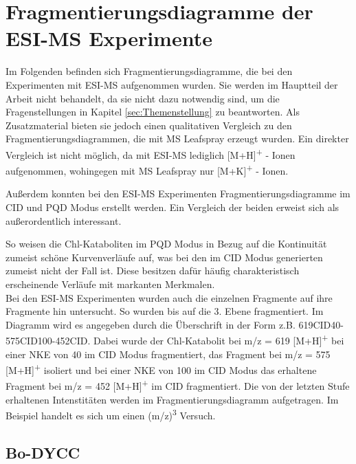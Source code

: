 \chapter{Fragmentierungsdiagramme der ESI-MS Experimente}

Im Folgenden befinden sich Fragmentierungsdiagramme, die bei den Experimenten mit ESI-MS aufgenommen wurden. Sie werden im Hauptteil der Arbeit nicht behandelt, da sie nicht dazu notwendig sind, um die Fragenstellungen in Kapitel \ref{sec:Themenstellung} zu beantworten. Als Zusatzmaterial bieten sie jedoch einen qualitativen Vergleich zu den Fragmentierungsdiagrammen, die mit MS Leafspray erzeugt wurden. Ein direkter Vergleich ist nicht möglich, da mit ESI-MS lediglich [M+H]\textsuperscript{+} - Ionen aufgenommen, wohingegen mit MS Leafspray nur [M+K]\textsuperscript{+} - Ionen.

Außerdem konnten bei den ESI-MS Experimenten Fragmentierungsdiagramme im CID und PQD Modus erstellt werden. Ein Vergleich der beiden erweist sich als außerordentlich interessant. 

So weisen die Chl-Kataboliten im PQD Modus in Bezug auf die Kontinuität zumeist schöne Kurvenverläufe auf, was bei den im CID Modus generierten zumeist nicht der Fall ist. Diese besitzen dafür häufig charakteristisch erscheinende Verläufe mit markanten Merkmalen. \\

Bei den ESI-MS Experimenten wurden auch die einzelnen Fragmente auf ihre Fragmente hin untersucht. So wurden bis auf die 3. Ebene fragmentiert. Im Diagramm wird es angegeben durch die Überschrift in der Form z.B. 619CID40-575CID100-452CID. Dabei wurde der Chl-Katabolit bei m/z = 619 [M+H]\textsuperscript{+} bei einer NKE von 40 im CID Modus fragmentiert, das Fragment bei m/z = 575 [M+H]\textsuperscript{+} isoliert und bei einer NKE von 100 im CID Modus das erhaltene Fragment bei m/z = 452 [M+H]\textsuperscript{+} im CID fragmentiert. Die von der letzten Stufe erhaltenen Intenstitäten werden im Fragmentierungsdiagramm aufgetragen. Im Beispiel handelt es sich um einen (m/z)\textsuperscript{3} Versuch.

\pagebreak
\section{Bo-DYCC}

